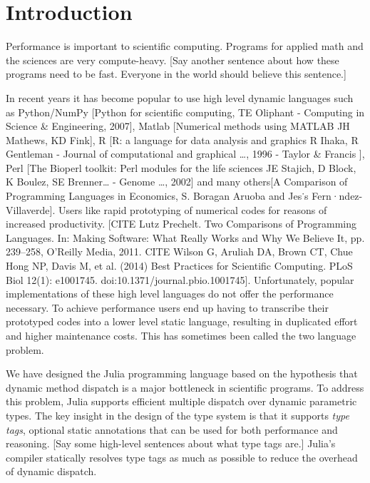\section{Introduction}
Performance is important to scientific computing. Programs for applied math and the sciences are very compute-heavy. [Say another sentence about how these programs need to be fast. Everyone in the world should believe this sentence.]

In recent years it has become popular to use high level dynamic languages such as Python/NumPy [Python for scientific computing, TE Oliphant - Computing in Science & Engineering, 2007], Matlab [Numerical methods using MATLAB
JH Mathews, KD Fink], R [R: a language for data analysis and graphics
R Ihaka, R Gentleman - Journal of computational and graphical …, 1996 - Taylor & Francis
], Perl [The Bioperl toolkit: Perl modules for the life sciences
JE Stajich, D Block, K Boulez, SE Brenner… - Genome …, 2002] and many others[A Comparison of Programming Languages in Economics, S. Boragan Aruoba and Jes˙s Fern·ndez-Villaverde]. Users like rapid prototyping of numerical codes for reasons of increased productivity. [CITE Lutz Prechelt. Two Comparisons of Programming Languages. In: Making Software: What Really Works and Why We Believe It, pp. 239--258, O'Reilly Media, 2011. CITE Wilson G, Aruliah DA, Brown CT, Chue Hong NP, Davis M, et al. (2014) Best Practices for Scientific Computing. PLoS Biol 12(1): e1001745. doi:10.1371/journal.pbio.1001745]. Unfortunately, popular implementations of these high level languages do not offer the performance necessary. To achieve performance users end up having to transcribe their prototyped codes into a lower level static language, resulting in duplicated effort and higher maintenance costs. This has sometimes been called the two language problem.

We have designed the Julia programming language based on the hypothesis that dynamic method dispatch is a major bottleneck in scientific programs. To address this problem, Julia supports efficient multiple dispatch over dynamic parametric types. The key insight in the design of the type system is that it supports \emph{type tags}, optional static annotations that can be used for both performance and reasoning. [Say some high-level sentences about what type tags are.]  Julia’s compiler statically resolves type tags as much as possible to reduce the overhead of dynamic dispatch.

